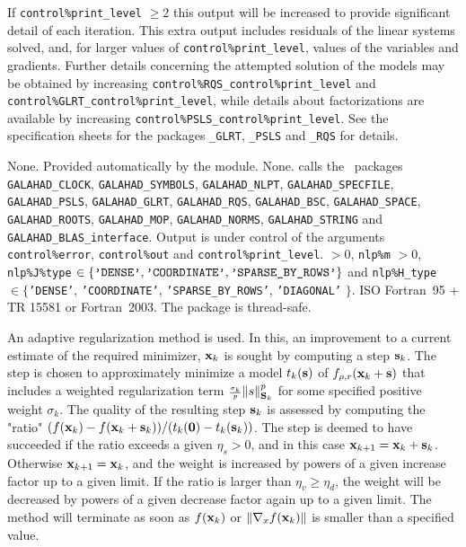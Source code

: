 \documentclass{galahad}
\newcommand{\packagename}{NLS}
\begin{document}
If {\tt control\%print\_level} $\geq 2$ this
output will be increased to provide significant detail of each iteration.
This extra output includes residuals of the linear systems solved, and,
for larger values of {\tt control\%print\_level}, values of the variables
and gradients. Further details concerning the attempted solution of the models
may be obtained by increasing
{\tt control\%RQS\_control\%print\_level}
and
{\tt control\%GLRT\_control\%print\_level},
while details about factorizations are available
by increasing
{\tt control\%PSLS\_control\%print\_level}.
See the specification sheets for the packages
{\tt \libraryname\_GLRT},
{\tt \libraryname\_PSLS} and
{\tt \libraryname\_RQS}
for details.


\galgeneral

\galcommon None.
\galworkspace Provided automatically by the module.
\galroutines None.
\galmodules {\tt \packagename\_solve} calls the \galahad\ packages
{\tt GALAHAD\_CLOCK},
{\tt GALAHAD\_SY\-M\-BOLS}, \sloppy
{\tt GALAHAD\_NLPT},
{\tt GALAHAD\_SPECFILE},
{\tt GALAHAD\_PSLS},
{\tt GALAHAD\_GLRT},
{\tt GALAHAD\_RQS},
{\tt GALAHAD\_BSC},
{\tt GALAHAD\_SPACE},
{\tt GALAHAD\_ROOTS},
{\tt GALAHAD\_MOP},
{\tt GALAHAD\_NORMS},
{\tt GALAHAD\_STRING}
and
{\tt GALAHAD\_BLAS\_interface}.
\galio Output is under control of the arguments
 {\tt control\%error}, {\tt control\%out} and
{\tt control\%print\_level}.
 $> 0$, {\tt nlp\%m} $> 0$,
{\tt nlp\%J\%type} $\in \{
  \mbox{\tt 'DENSE'}, \mbox{\tt 'COORDINATE'}, \mbox{\tt 'SPARSE\_BY\_ROWS'}
 \}$ and
{\tt nlp\%H\_type} $\in \{${\tt 'DENSE'},
 {\tt 'COORDINATE'}, {\tt 'SPARSE\_BY\_ROWS'}, {\tt 'DIAGONAL'} $\}$.
\galportability ISO Fortran~95 + TR 15581 or Fortran~2003.
The package is thread-safe.


\galmethod
An adaptive regularization method is used.
In this, an improvement to a current
estimate of the required minimizer, ${\mathbf{x}}_k$ is sought by computing a
step ${\mathbf{s}}_k$. The step is chosen to approximately minimize a model $t_k({\mathbf{s}})$
of $f_{\rho,r}({\mathbf{x}}_k+{\mathbf{s}})$
that includes a weighted regularization term
${\scriptstyle \frac{\sigma_k}{p}} \|s\|_{{\mathbf{S}}_k}^p$
for some specified positive weight $\sigma_k$. The quality of the
resulting step ${\mathbf{s}}_k$ is assessed by computing the "ratio"
$(f({\mathbf{x}}_k) - f({\mathbf{x}}_k + {\mathbf{s}}_k))/(t_k({\mathbf{0}}) - t_k({\mathbf{s}}_k))$.
The step is deemed to have succeeded if the ratio exceeds a given $\eta_s > 0$,
and in this case ${\mathbf{x}}_{k+1} = {\mathbf{x}}_k + {\mathbf{s}}_k$. Otherwise
${\mathbf{x}}_{k+1} = {\mathbf{x}}_k$, and the weight is increased by powers of a given
increase factor up to a given limit. If the ratio is larger than
$\eta_v \geq \eta_d$, the weight will be decreased by powers of a given
decrease factor again up to a given limit. The method will terminate
as soon as $f({\mathbf{x}}_k)$ or
$\|\nabla_x f({\mathbf{x}}_k)\|$ is smaller than a specified value.
\end{document}
